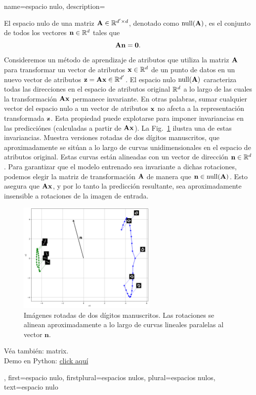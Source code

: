 {name={espacio nulo},
	description={El espacio nulo de una matriz ${\bf A} \in \mathbb{R}^{d' \times d}$, 
		denotado como ${\rm null}({\bf A})$, es el conjunto de todos los vectores $\mathbf{n} \in \mathbb{R}^d$ 
    		tales que $${\bf A} \mathbf{n} = \mathbf{0}.$$ 
		Consideremos un método de aprendizaje de atributos que utiliza la matriz ${\bf A}$ para transformar 
		un vector de atributos $\mathbf{x} \in \mathbb{R}^{d}$ de un punto de datos 
		en un nuevo vector de atributos ${\bf z} = {\bf A} \mathbf{x} \in \mathbb{R}^{d'}$. 
		El espacio nulo ${\rm null}({\bf A})$ caracteriza todas las direcciones en el 
		espacio de atributos original $\mathbb{R}^{d}$ a lo largo de las cuales la transformación 
		${\bf A} \mathbf{x}$ permanece invariante. En otras palabras, sumar cualquier vector del 
		espacio nulo a un vector de atributos ${\bf x}$ no afecta a la representación transformada ${\bf z}$. 
		Esta propiedad puede explotarse para imponer invariancias en las predicciónes 
		(calculadas a partir de ${\bf A} \mathbf{x}$). La Fig.\ \ref{fig:nullspace-rotation-dict} 
		ilustra una de estas invariancias. Muestra versiones rotadas de dos dígitos manuscritos, 
		que aproximadamente se sitúan a lo largo de curvas unidimensionales en el espacio de atributos original. 
		Estas curvas están alineadas con un vector de dirección $\mathbf{n} \in \mathbb{R}^{d}$. 
    		Para garantizar que el modelo entrenado sea invariante a dichas rotaciones, podemos 
		elegir la matriz de transformación ${\bf A}$ de manera que $\mathbf{n} \in {\rm null}({\bf A})$. 
		Esto asegura que ${\bf A} \mathbf{x}$, y por lo tanto la predicción resultante, 
		sea aproximadamente insensible a rotaciones de la imagen de entrada.
		\begin{figure}[H]
      			\centering
      			\includegraphics[width=0.6\textwidth]{../../assets/pythonsnacks/nullspace_0_1.png}
	  		\caption{Imágenes rotadas de dos dígitos manuscritos. Las rotaciones se alinean aproximadamente 
	  		a lo largo de curvas lineales paralelas al vector $\mathbf{n}$.\label{fig:nullspace-rotation-dict}}	
	       	\end{figure}
		Véa también: \gls{matrix}. \\ 
		Demo en Python: \href{https://github.com/AaltoDictionaryofML/AaltoDictionaryofML.github.io/blob/main/assets/pythonsnacks/nullspace.py}{click aquí}},
 	first={espacio nulo},
 	firstplural={espacios nulos},
 	plural={espacios nulos},
 	text={espacio nulo}
}



